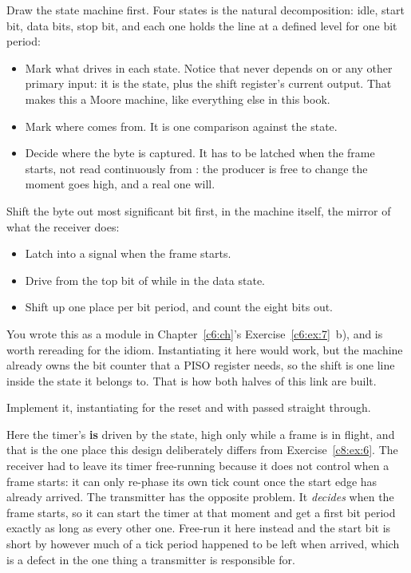 \begin{parts}
  \item Draw the state machine first. Four states is the natural decomposition: idle, start bit,
    data bits, stop bit, and each one holds the line at a defined level for one bit period:
    \begin{itemize}
      \item Mark what drives  in each state. Notice that  never depends on
         or any other primary input: it is the state, plus the shift register's current
        output. That makes this a Moore machine, like everything else in this book.
      \item Mark where  comes from. It is one comparison against the state.
      \item Decide where the byte is captured. It has to be latched when the frame starts, not read
        continuously from : the producer is free to change  the moment
         goes high, and a real one will.
    \end{itemize}
  \item Shift the byte out most significant bit first, in the machine itself, the mirror of what
    the receiver does:
    \begin{itemize}
      \item Latch  into a  signal when the frame starts.
      \item Drive  from the top bit of  while in the data state.
      \item Shift  up one place per bit period, and count the eight bits out.
    \end{itemize}
    You wrote this as a module in Chapter~\ref{c6:ch}'s Exercise~\ref{c6:ex:7}~b), and 
    is worth rereading for the idiom. Instantiating it here would work, but the machine already
    owns the bit counter that a PISO register needs, so the shift is one line inside the state it
    belongs to. That is how both halves of this link are built.
  \item Implement it, instantiating  for the reset and  with
     passed straight through.

    Here the timer's  \textbf{is} driven by the state, high only while a frame is in
    flight, and that is the one place this design deliberately differs from
    Exercise~\ref{c8:ex:6}. The receiver had to leave its timer free-running because it does not
    control when a frame starts: it can only re-phase its own tick count once the start edge has
    already arrived. The transmitter has the opposite problem. It \emph{decides} when the frame
    starts, so it can start the timer at that moment and get a first bit period exactly as long as
    every other one. Free-run it here instead and the start bit is short by however much of a tick
    period happened to be left when  arrived, which is a defect in the one thing a
    transmitter is responsible for.


\end{parts}
